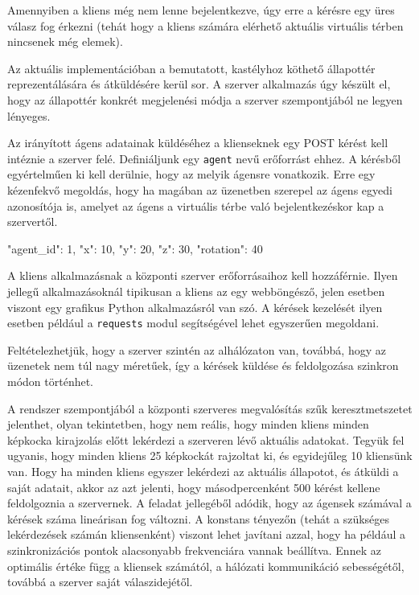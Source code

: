 Amennyiben a kliens még nem lenne bejelentkezve, úgy erre a kérésre egy üres válasz fog érkezni (tehát hogy a kliens számára elérhető aktuális virtuális térben nincsenek még elemek).

Az aktuális implementációban a bemutatott, kastélyhoz köthető állapottér reprezentálására és átküldésére kerül sor. A szerver alkalmazás úgy készült el, hogy az állapottér konkrét megjelenési módja a szerver szempontjából ne legyen lényeges.


Az irányított ágens adatainak küldéséhez a klienseknek egy POST kérést kell intéznie a szerver felé.
Definiáljunk egy \texttt{agent} nevű erőforrást ehhez.
A kérésből egyértelműen ki kell derülnie, hogy az melyik ágensre vonatkozik.
Erre egy kézenfekvő megoldás, hogy ha magában az üzenetben szerepel az ágens egyedi azonosítója is, amelyet az ágens a virtuális térbe való bejelentkezéskor kap a szervertől.


\begin{python}
{
  "agent_id": 1,
  "x": 10, "y": 20, "z": 30,
  "rotation": 40
}
\end{python}


A kliens alkalmazásnak a központi szerver erőforrásaihoz kell hozzáférnie.
Ilyen jellegű alkalmazásoknál tipikusan a kliens az egy webböngésző, jelen esetben viszont egy grafikus Python alkalmazásról van szó.
A kérések kezelését ilyen esetben például a \texttt{requests} modul segítségével lehet egyszerűen megoldani.


Feltételezhetjük, hogy a szerver szintén az alhálózaton van, továbbá, hogy az üzenetek nem túl nagy méretűek, így a kérések küldése és feldolgozása szinkron módon történhet.


A rendszer szempontjából a központi szerveres megvalósítás szűk keresztmetszetet jelenthet, olyan tekintetben, hogy nem reális, hogy minden kliens minden képkocka kirajzolás előtt lekérdezi a szerveren lévő aktuális adatokat.
Tegyük fel ugyanis, hogy minden kliens 25 képkockát rajzoltat ki, és egyidejűleg 10 kliensünk van.
Hogy ha minden kliens egyszer lekérdezi az aktuális állapotot, és átküldi a saját adatait, akkor az azt jelenti, hogy másodpercenként 500 kérést kellene feldolgoznia a szervernek.
A feladat jellegéből adódik, hogy az ágensek számával a kérések száma lineárisan fog változni.
A konstans tényezőn (tehát a szükséges lekérdezések számán kliensenként) viszont lehet javítani azzal, hogy ha például a szinkronizációs pontok alacsonyabb frekvenciára vannak beállítva.
Ennek az optimális értéke függ a kliensek számától, a hálózati kommunikáció sebességétől, továbbá a szerver saját válaszidejétől.

